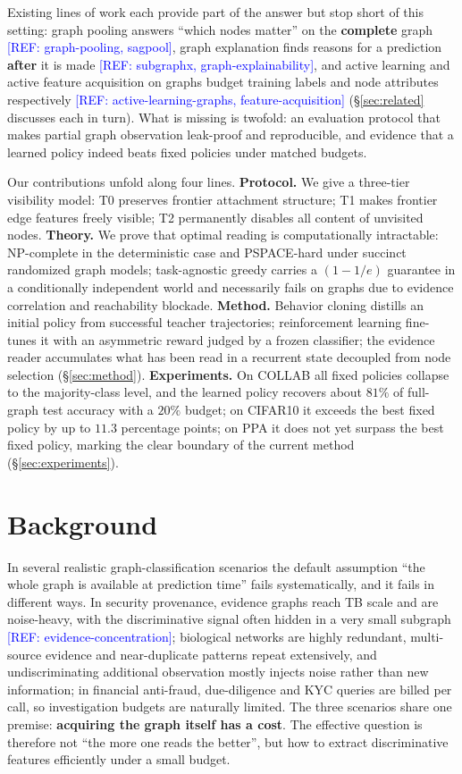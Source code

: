 \documentclass{article}
\newcommand{\refadd}[1]{\textcolor{blue}{[REF: #1]}}
\begin{document}
Existing lines of work each provide part of the answer but stop short of this setting: graph pooling answers ``which nodes matter'' on the \textbf{complete} graph \refadd{graph-pooling, sagpool}, graph explanation finds reasons for a prediction \textbf{after} it is made \refadd{subgraphx, graph-explainability}, and active learning and active feature acquisition on graphs budget training labels and node attributes respectively \refadd{active-learning-graphs, feature-acquisition} (\S\ref{sec:related} discusses each in turn). What is missing is twofold: an evaluation protocol that makes partial graph observation leak-proof and reproducible, and evidence that a learned policy indeed beats fixed policies under matched budgets.

Our contributions unfold along four lines. \textbf{Protocol.} We give a three-tier visibility model: T0 preserves frontier attachment structure; T1 makes frontier edge features freely visible; T2 permanently disables all content of unvisited nodes. \textbf{Theory.} We prove that optimal reading is computationally intractable: NP-complete in the deterministic case and PSPACE-hard under succinct randomized graph models; task-agnostic greedy carries a $(1-1/e)$ guarantee in a conditionally independent world and necessarily fails on graphs due to evidence correlation and reachability blockade. \textbf{Method.} Behavior cloning distills an initial policy from successful teacher trajectories; reinforcement learning fine-tunes it with an asymmetric reward judged by a frozen classifier; the evidence reader accumulates what has been read in a recurrent state decoupled from node selection (\S\ref{sec:method}). \textbf{Experiments.} On COLLAB all fixed policies collapse to the majority-class level, and the learned policy recovers about $81\%$ of full-graph test accuracy with a $20\%$ budget; on CIFAR10 it exceeds the best fixed policy by up to $11.3$ percentage points; on PPA it does not yet surpass the best fixed policy, marking the clear boundary of the current method (\S\ref{sec:experiments}).

\section{Background}
\label{sec:background}

In several realistic graph-classification scenarios the default assumption ``the whole graph is available at prediction time'' fails systematically, and it fails in different ways. In security provenance, evidence graphs reach TB scale and are noise-heavy, with the discriminative signal often hidden in a very small subgraph \refadd{evidence-concentration}; biological networks are highly redundant, multi-source evidence and near-duplicate patterns repeat extensively, and undiscriminating additional observation mostly injects noise rather than new information; in financial anti-fraud, due-diligence and KYC queries are billed per call, so investigation budgets are naturally limited. The three scenarios share one premise: \textbf{acquiring the graph itself has a cost}. The effective question is therefore not ``the more one reads the better'', but how to extract discriminative features efficiently under a small budget.
\end{document}
